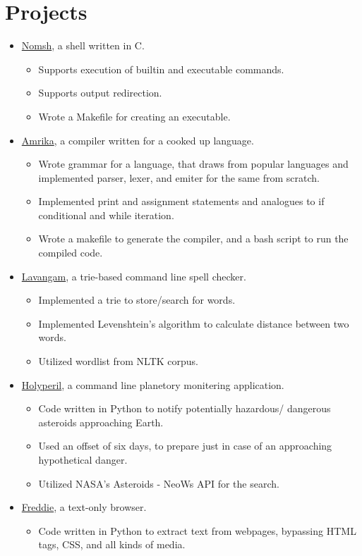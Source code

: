 \documentclass{article}
\begin{document}
\section*{Projects}
\begin{itemize}
\item \href{https://github.com/rcreddyn/nomsh}{Nomsh}, a shell written in C.
\begin{itemize}
\item Supports execution of builtin and executable commands.
\item Supports output redirection.
\item Wrote a Makefile for creating an executable.
\end{itemize}
\item  \href{https://github.com/rcreddyn/nomsh}{Amrika}, a compiler written for a cooked up language.
\begin{itemize}
\item Wrote grammar for a language, that draws from popular languages and implemented parser, lexer, and emiter for the same from scratch.
\item Implemented print and assignment statements and analogues to if conditional and while iteration.
\item Wrote a makefile to generate the compiler, and a bash script to run the compiled code.
\end{itemize}
\item \href{https://github.com/rcreddyn/nomsh}{Lavangam}, a trie-based command line spell checker.
\begin{itemize}
\item Implemented a trie to store/search for words.
\item Implemented Levenshtein's algorithm to calculate distance between two words.
\item Utilized wordlist from NLTK corpus.
\end{itemize}
\item \href{https://github.com/rcreddyn/nomsh}{Holyperil}, a command line planetory monitering application. 
\begin{itemize}
\item Code written in Python to notify potentially hazardous/ dangerous asteroids approaching Earth.
\item Used an offset of six days, to prepare just in case of an approaching hypothetical danger.
\item Utilized NASA's Asteroids - NeoWs API for the search.
\end{itemize}
\item \href{https://github.com/rcreddyn/nomsh}{Freddie}, a text-only browser.
\begin{itemize}
\item Code written in Python to extract text from webpages, bypassing HTML tags, CSS, and all kinds of media.
\end{itemize}
\end{itemize} 
\end{document}
